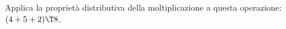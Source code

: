 \item Applica la proprietà distributiva della moltiplicazione a questa operazione: $(4 + 5 + 2)\T8$.